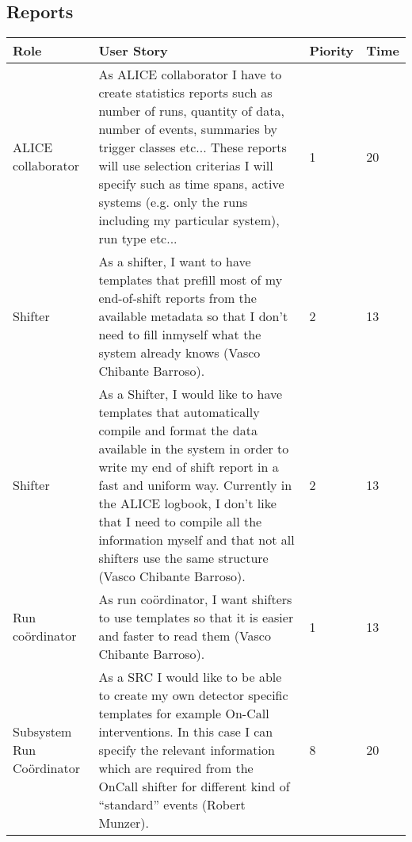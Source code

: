 \subsection{Reports}
\begin{longtable}{ | p{2cm} | p{8cm} | p{1.5cm} | l |}
\hline
Role & User Story & Piority & Time \\ \hline
ALICE collaborator &  As ALICE collaborator I have to create statistics reports such as number of runs, quantity of data, number of events, summaries by trigger
classes etc... These reports will use selection criterias I will specify such as time spans, active systems (e.g. only the runs including my particular system), run type etc... & 1 & 20 \\ \hline
Shifter &  As a shifter, I want to have templates that prefill most of my end-of-shift reports from the available metadata so that I don’t need to fill inmyself what the system already knows (Vasco Chibante Barroso). & 2 & 13 \\ \hline
Shifter &  As a Shifter, I would like to have templates that automatically compile and format the data available in the system in order to write my end of shift report in a fast and uniform way. Currently in the ALICE logbook, I don’t like that I need to compile all the information myself and that
not all shifters use the same structure (Vasco Chibante Barroso). & 2 & 13 \\ \hline
Run coördinator &  As run coördinator, I want shifters to use templates so that it is easier
and faster to read them (Vasco Chibante Barroso). & 1 & 13 \\ \hline
Subsystem Run Coördinator & As a SRC I would like to be able to create my own detector specific templates for example On-Call interventions. In this case I can specify the relevant information which are required from the OnCall shifter for different kind of “standard” events (Robert Munzer). & 8 & 20 \\ \hline
\end{longtable}
\newpage
